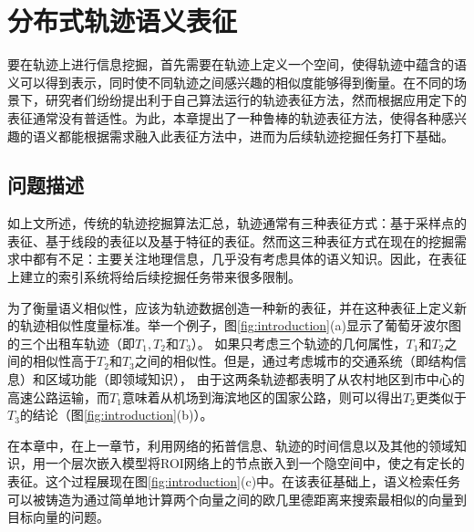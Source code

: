 
\chapter{分布式轨迹语义表征}
\label{chapter:main2}

要在轨迹上进行信息挖掘，首先需要在轨迹上定义一个空间，使得轨迹中蕴含的语义可以得到表示，同时使不同轨迹之间感兴趣的相似度能够得到衡量。在不同的场景下，研究者们纷纷提出利于自己算法运行的轨迹表征方法，然而根据应用定下的表征通常没有普适性。为此，本章提出了一种鲁棒的轨迹表征方法，使得各种感兴趣的语义都能根据需求融入此表征方法中，进而为后续轨迹挖掘任务打下基础。


\section{问题描述}
如上文所述，传统的轨迹挖掘算法汇总，轨迹通常有三种表征方式：基于采样点的表征、基于线段的表征以及基于特征的表征。然而这三种表征方式在现在的挖掘需求中都有不足：主要关注地理信息，几乎没有考虑具体的语义知识。因此，在表征上建立的索引系统将给后续挖掘任务带来很多限制。

为了衡量语义相似性，应该为轨迹数据创造一种新的表征，并在这种表征上定义新的轨迹相似性度量标准。举一个例子，图\ref{fig:introduction}(a)显示了葡萄牙波尔图的三个出租车轨迹（即$ T_1, T_2$和$T_3 $）。 如果只考虑三个轨迹的几何属性，$ T_1 $和$ T_2 $之间的相似性高于$ T_2 $和$ T_3 $之间的相似性。但是，通过考虑城市的交通系统（即结构信息）和区域功能（即领域知识）， 由于这两条轨迹都表明了从农村地区到市中心的高速公路运输，而$T_1$意味着从机场到海滨地区的国家公路，则可以得出$ T_2 $更类似于$ T_3 $的结论（图\ref{fig:introduction}(b)）。

在本章中，在上一章节，利用网络的拓普信息、轨迹的时间信息以及其他的领域知识，用一个层次嵌入模型将ROI网络上的节点嵌入到一个隐空间中，使之有定长的表征。这个过程展现在图\ref{fig:introduction}(c)中。在该表征基础上，语义检索任务可以被铸造为通过简单地计算两个向量之间的欧几里德距离来搜索最相似的向量到目标向量的问题。

